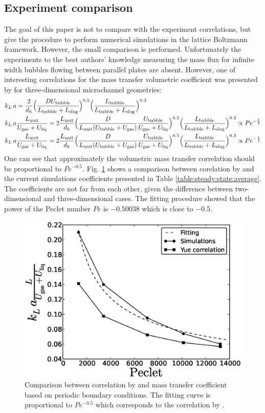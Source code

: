 \documentclass{article}
\newcommand{\beqal}{\begin{equation}\begin{aligned}}
\newcommand{\feqal}{\end{aligned}\end{equation}}
\newcommand{\vol}{k_L\,a}
\newcommand{\lbubble}{L_{\mathrm{bubble}}}
\newcommand{\lunit}{L_{\mathrm{unit}}}
\newcommand{\lslug}{L_{\mathrm{slug}}}
\newcommand{\ububble}{U_{\mathrm{bubble}}}
\newcommand{\uliq}{U_{\mathrm{liq}}}
\newcommand{\ugas}{U_{\mathrm{gas}}}
\begin{document}
\subsection{Experiment comparison}
The goal of this paper is not to compare with the experiment correlations, but give the
procedure to perform numerical simulations in the lattice Boltzmann framework. However, the small
comparison is performed. 
Unfortunately the experiments to the best authors' knowledge measuring the mass flux for infinite
width  bubbles flowing between parallel plates are absent. However, one of interesting
correlations for the mass transfer volumetric coefficient was presented by
\citet{yue-mass} for three-dimensional microchannel geometries:
\beqal
&\vol=\frac{2}{d_h}\Bigl(\frac{D \ububble}{\lbubble+\lslug}\Bigr)^{0.5}
\Bigl(\frac{\lbubble}{\lbubble+\lslug}\Bigr)^{0.3}\\
&\vol \frac{\lunit}{\ugas+\uliq}=2\frac{\lunit}{d_h} \Bigl(\frac{D 
}{\lunit (\ububble+\ugas)} \frac{\ububble}{\ugas+\uliq}\Bigr)^{0.5}
\Bigl(\frac{\lbubble}{\lbubble+\lslug}\Bigr)^{0.3} \propto Pe^{-\frac{1}{2}}\\
&\vol \frac{\lunit}{\ugas+\uliq}=2\frac{\lunit}{d_h} \Bigl(\frac{D 
}{\lunit (\ububble+\ugas)} \frac{\ububble}{\ugas+\uliq}\Bigr)^{0.5}
\Bigl(\frac{\lbubble}{\lbubble+\lslug}\Bigr)^{0.3} \propto Pe^{-\frac{1}{2}}
\feqal
One can see that approximately the volumetric mass transfer correlation should be proportional to
$Pe^{-0.5}$. Fig. \ref{fig:volume:mass:coefficient} shows a comparison between corelation by
\citet{yue-mass} and the current simulations coefficients presented in Table
\ref{table:steady:state:average}. The coefficients are not far from each other, given the difference
between two-dimensional and three-dimensional cases. The fitting procedure showed that the power of
the Peclet number $Pe$ is $-0.50038$ which is close to $-0.5$. 
\begin{figure}[htb!]
\includegraphics[width=\textwidth]{Figures/correlations_comparison.eps}
\caption{Comparison between correlation by \citet{yue-mass} and mass transfer coefficient based
on periodic boundary conditions. The fitting curve is proportional to $Pe^{-0.5}$ which corresponds
to the correlation by \citet{yue-mass}.\label{fig:volume:mass:coefficient}}
\end{figure}
\end{document}
